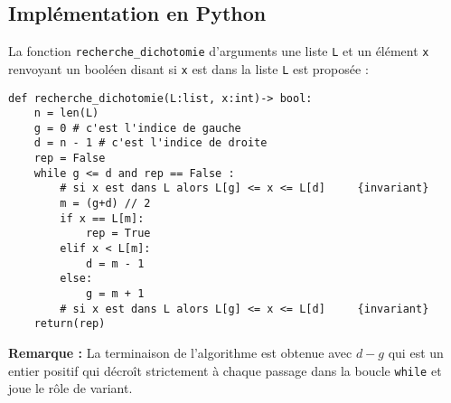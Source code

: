  

\subsection{Implémentation en Python}


La fonction \lstinline{recherche_dichotomie} d'arguments une liste \lstinline{L} et un élément \lstinline{x} renvoyant un booléen disant si \lstinline{x} est dans la liste \lstinline{L} est proposée :



\begin{lstlisting}
def recherche_dichotomie(L:list, x:int)-> bool:
    n = len(L)
    g = 0 # c'est l'indice de gauche
    d = n - 1 # c'est l'indice de droite
    rep = False
    while g <= d and rep == False :
        # si x est dans L alors L[g] <= x <= L[d]     {invariant}
        m = (g+d) // 2 
        if x == L[m]:
            rep = True
        elif x < L[m]:
            d = m - 1
        else:
            g = m + 1
        # si x est dans L alors L[g] <= x <= L[d]     {invariant}
    return(rep)
\end{lstlisting} 



\textbf{Remarque :} La terminaison de l'algorithme est obtenue avec $d-g$ qui est un entier positif qui décro\^{i}t strictement à chaque passage dans la boucle \lstinline{while} et joue le rôle de variant.

